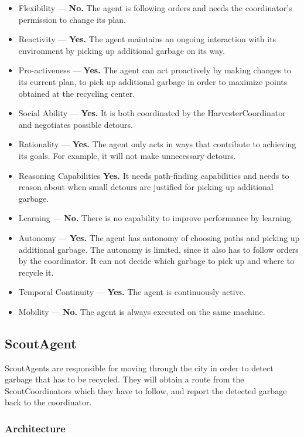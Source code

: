 \begin{itemize}
	\item Flexibility — \textbf{No.} The agent is following orders and needs the coordinator's permission to change its plan.
	\item Reactivity — \textbf{Yes.} The agent maintains an ongoing interaction with its environment by picking up additional garbage on its way.
	\item Pro-activeness — \textbf{Yes.} The agent can act proactively by making changes to its current plan, to pick up additional garbage in order to maximize points obtained at the recycling center.
	\item Social Ability — \textbf{Yes.} It is both coordinated by the HarvesterCoordinator and negotiates possible detours.
	\item Rationality — \textbf{Yes.} The agent only acts in ways that contribute to achieving its goals. For example, it will not make unnecessary detours.
	\item Reasoning Capabilities \textbf{Yes.} It needs path-finding capabilities and needs to reason about when small detours are justified for picking up additional garbage.
	\item Learning — \textbf{No.} There is no capability to improve performance by learning.
	\item Autonomy — \textbf{Yes.} The agent has autonomy of choosing paths and picking up additional garbage. The autonomy is limited, since it also has to follow orders by the coordinator. It can not decide which garbage to pick up and where to recycle it.
	\item Temporal Continuity — \textbf{Yes.} The agent is continuously active.
	\item Mobility — \textbf{No.} The agent is always executed on the same machine.
\end{itemize}

\subsection{ScoutAgent}

ScoutAgents are responsible for moving through the city in order to detect garbage that has to be recycled. They will obtain a route from the ScoutCoordinators which they have to follow, and report the detected garbage back to the coordinator.

\subsubsection*{Architecture}

